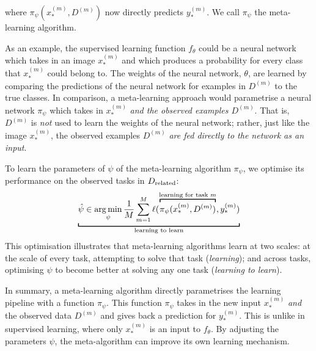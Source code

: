 \documentclass[12pt, twoside]{report}
\begin{document}
\parbox{\linewidth}{  %
where $\displaystyle \pi_{\psi}(x^{(m)}_*, D^{(m)})$ now directly predicts $\displaystyle y^{(m)}_*$.
We call $\pi_\psi$ the meta-learning algorithm.
}\hspace{-30pt}

As an example, the supervised learning function $f_\theta$ could be a neural network
which takes in an image $\displaystyle x^{(m)}_*$ and which produces a probability for every class that $\displaystyle x^{(m)}_*$ could belong to.
The weights of the neural network, $\theta$, are learned by comparing the predictions of the neural network for examples in $D^{(m)}$ to the true classes.
In comparison, a meta-learning approach would parametrise a neural network $\pi_\psi$ which takes in $\displaystyle x^{(m)}_*$ \emph{and the observed examples $D^{(m)}$}.
That is, $D^{(m)}$ is \emph{not} used to learn the weights of the neural network;
rather, just like the image $\displaystyle x^{(m)}_*$, the observed examples $D^{(m)}$ \emph{are fed directly to the network as an input}.

To learn the parameters of $\psi$ of the meta-learning algorithm $\pi_\psi$, 
we optimise its performance on the observed tasks in $D\ss{related}$:
\begin{equation}
    \underbracket[1pt]{\hat\psi \in \argmin_{\psi} \frac1M \sum_{m=1}^M \ell(
    \overbracket[1pt]{
        \pi_\psi(
            x^{(m)}_*, D^{(m)}
        )
    }^{\text{learning for task $m$}}
    ,
    y^{(m)}_*)}_{\text{learning to learn}}
\end{equation}
This optimisation illustrates that meta-learning algorithms learn at two scales:
at the scale of every task, attempting to solve that task (\emph{learning});
and across tasks,
optimising $\psi$ to become better at solving any one task (\emph{learning to learn}).

In summary, a meta-learning algorithm directly parametrises the learning pipeline with a function $\pi_\psi$.
This function $\pi_\psi$ takes in the new input $\displaystyle x_*^{(m)}$ \emph{and} the observed data $D^{(m)}$ and gives back a prediction for $\displaystyle y_*^{(m)}$.
This is unlike in supervised learning, where only $\displaystyle x_*^{(m)}$ is an input to $f_\theta$.
By adjusting the parameters $\psi$, the meta-algorithm can improve its own learning mechanism.
\end{document}
